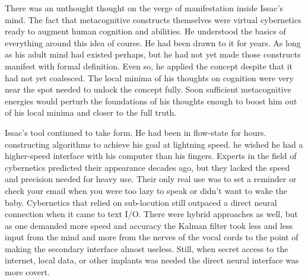\documentclass[a4paper,twoside,fontsize=12pt,pagesize=auto]{scrbook}
\begin{document}
There was an unthought thought on the verge of manifestation inside Issac's mind. The fact that metacognitive constructs themselves were virtual cybernetics ready to augment human cognition and abilities. He understood the basics of everything around this idea of course. He had been drawn to it for years. As long as his adult mind had existed perhaps, but he had not yet made those constructs manifest with formal definition. Even so, he applied the concept despite that it had not yet coalesced. The local minima of his thoughts on cognition were very near the spot needed to unlock the concept fully. Soon sufficient metacognitive energies would perturb the foundations of his thoughts enough to boost him out of his local minima and closer to the full truth.

Issac's tool continued to take form. He had been in flow\hyp{}state for hours. constructing algorithms to achieve his goal at lightning speed. he wished he had a higher\hyp{}speed interface with his computer than his fingers. Experts in the field of cybernetics predicted their appearance decades ago, but they lacked the speed and precision needed for heavy use. Their only real use was to set a reminder or check your email when you were too lazy to speak or didn't want to wake the baby. Cybernetics that relied on sub\hyp{}locution still outpaced a direct neural connection when it came to text I/O. There were hybrid approaches as well, but as one demanded more speed and accuracy the Kalman filter took less and less input from the mind and more from the nerves of the vocal cords to the point of making the secondary interface almost useless. Still, when secret access to the internet, local data, or other implants was needed the direct neural interface was more covert.
\end{document}

